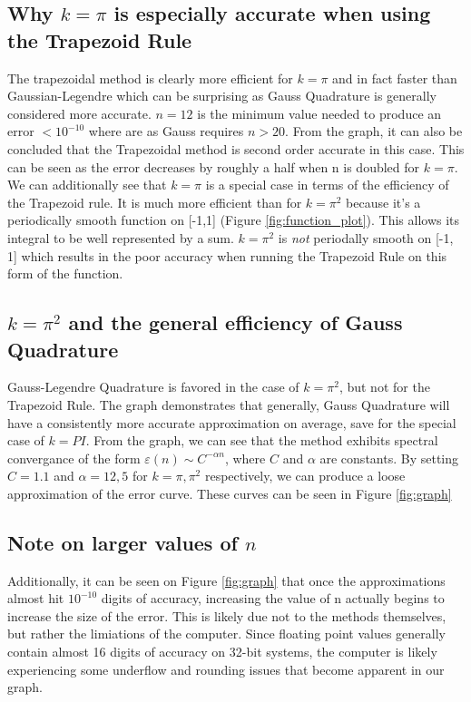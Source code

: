 \documentclass[12pt]{article}
\begin{document}
\subsection{Why \(k=\pi\) is especially accurate when using the Trapezoid Rule}
The trapezoidal method is clearly more efficient for \(k = \pi\) and in fact faster than Gaussian-Legendre
which can be surprising as Gauss Quadrature is generally considered more accurate. \(n = 12\) is the minimum
value needed to produce an error \(<10^{-10}\) where are as Gauss requires \(n > 20\). From the graph, it can
also be concluded that the Trapezoidal method is second order accurate in this case. This can be seen as the error decreases
by roughly a half when n is doubled for \(k=\pi\). We can additionally see that \(k=\pi\) is a special case
in terms of the efficiency of the Trapezoid rule. It is much more efficient than for \(k=\pi^2\)
because it's a periodically smooth function on [-1,1] (Figure \ref{fig:function_plot}). This allows its integral to be well represented
by a sum. \(k=\pi^2\) is \emph{not} periodally smooth on [-1, 1] which results in the poor accuracy when running
the Trapezoid Rule on this form of the function. 

\subsection{\(k=\pi^2\) and the general efficiency of Gauss Quadrature}
Gauss-Legendre Quadrature is favored in the case of \(k=\pi^2\), but not for the Trapezoid Rule. The graph demonstrates
that generally, Gauss Quadrature will have a consistently more accurate approximation on average, save for the special
case of \(k=PI\). From the graph, we can see that the method exhibits spectral convergance of the form \(\varepsilon(n) \sim C^{-\alpha n}\), 
where \(C\) and \(\alpha\) are constants. By setting \(C=1.1\) and \(\alpha=12, 5\) for \(k=\pi, \pi^2\)
respectively, we can produce a loose approximation of the error curve. These curves can be seen in Figure \ref{fig:graph}

\subsection{Note on larger values of \(n\)}
Additionally, it can be seen on Figure \ref{fig:graph} that once the approximations almost hit \(10^{-10}\) digits
of accuracy, increasing the value of n actually begins to increase the size of the error. This is likely due not to the
methods themselves, but rather the limiations of the computer. Since floating point values generally contain almost 16 digits
of accuracy on 32-bit systems, the computer is likely experiencing some underflow and rounding issues that become
apparent in our graph. 
\end{document}
